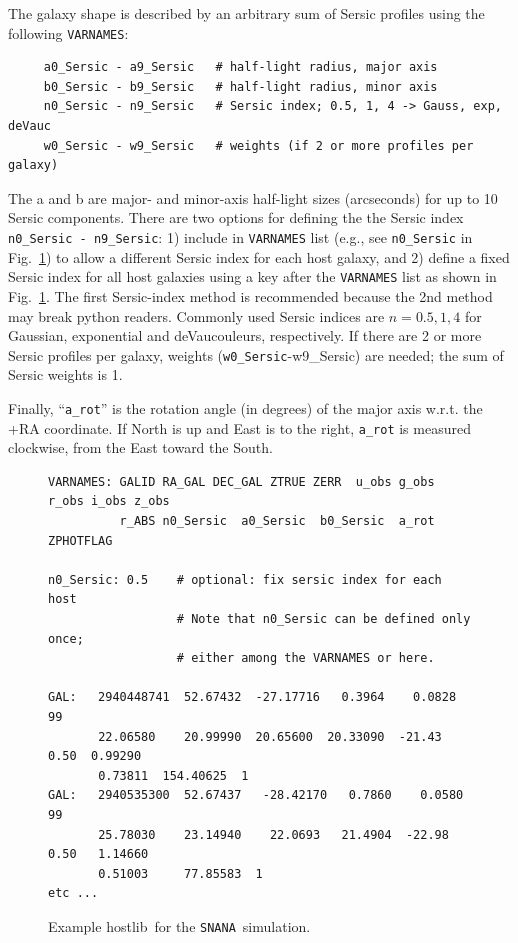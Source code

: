 \documentclass[12pt]{article}
\newcommand{\snana}{{\tt SNANA}}
\newcommand{\hostlib}{{\sc hostlib}}
\begin{document}
{The galaxy shape is described by an arbitrary sum of Sersic profiles
using the following {\tt VARNAMES}:
\begin{verbatim}
     a0_Sersic - a9_Sersic   # half-light radius, major axis
     b0_Sersic - b9_Sersic   # half-light radius, minor axis
     n0_Sersic - n9_Sersic   # Sersic index; 0.5, 1, 4 -> Gauss, exp, deVauc
     w0_Sersic - w9_Sersic   # weights (if 2 or more profiles per galaxy)
\end{verbatim}
%
The a and b are major- and minor-axis half-light sizes (arcseconds) 
for up to 10 Sersic components.
There are two options for defining the the Sersic index 
{\tt n0\_Sersic - n9\_Sersic}: 
1) include in {\tt VARNAMES} list 
(e.g., see {\tt n0\_Sersic} in Fig.~\ref{fig:hostlib})
to allow a different Sersic index for each host galaxy, and 
2) define a fixed Sersic index for all host galaxies using 
a key after the {\tt VARNAMES} list as shown in Fig.~\ref{fig:hostlib}.
The first Sersic-index method is recommended because the 
2nd method may break python readers.
Commonly used Sersic indices are $n=0.5, 1, 4$ 
for Gaussian, exponential and  deVaucouleurs,
respectively. 
If there are 2 or more Sersic profiles per galaxy, 
weights ({\tt w0\_Sersic}-{w9\_Sersic}) are needed;
the sum of Sersic weights is 1.

Finally, ``{\tt a\_rot}'' 
is the rotation angle (in degrees) of the major axis  w.r.t. 
the +RA coordinate.  If North is up and East is to the right, 
{\tt a\_rot} is measured clockwise, from the East toward the South.



\begin{figure}[!] 
\begin{center}
\caption{  Example \hostlib\ for the \snana\ simulation. }
\label{fig:hostlib}
\begin{Verbatim}[frame=single]
VARNAMES: GALID RA_GAL DEC_GAL ZTRUE ZERR  u_obs g_obs r_obs i_obs z_obs
          r_ABS n0_Sersic  a0_Sersic  b0_Sersic  a_rot  ZPHOTFLAG

n0_Sersic: 0.5    # optional: fix sersic index for each host
                  # Note that n0_Sersic can be defined only once;
                  # either among the VARNAMES or here.

GAL:   2940448741  52.67432  -27.17716   0.3964    0.0828    99  
       22.06580    20.99990  20.65600  20.33090  -21.43 0.50  0.99290  
       0.73811  154.40625  1
GAL:   2940535300  52.67437   -28.42170   0.7860    0.0580    99    
       25.78030    23.14940    22.0693   21.4904  -22.98 0.50   1.14660  
       0.51003     77.85583  1
etc ...
\end{Verbatim}
\end{center}
\end{figure}


}
\end{document}
